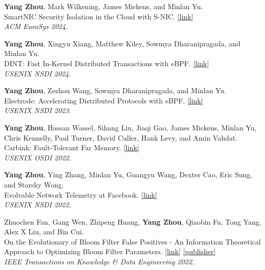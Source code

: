 \documentclass[letterpaper, 11pt]{article}
\newcounter{mySaveCounter}
\newenvironment{myEnumerateCitation}{%
  \begin{enumerate}[label={[\arabic*]},ref={[\arabic*]}]
    \usecounter{enumi}%
    \setcounter{enumi}{\value{mySaveCounter}}
    \setlength{\itemsep}{0pt}%
    \setlength{\parskip}{5pt}%
}
{%
  \setcounter{mySaveCounter}{\value{enumi}}\end{enumerate}%
}
\begin{document}
\begin{myEnumerateCitation}

\item \textbf{Yang Zhou}, Mark Wilkening, James Mickens, and Minlan Yu. 
\\SmartNIC Security Isolation in the Cloud with S-NIC. \href{https://dl.acm.org/doi/epdf/10.1145/3627703.3650071}{[link]}
\\\textit{ACM EuroSys 2024}.

\item \textbf{Yang Zhou}, Xingyu Xiang, Matthew Kiley, Sowmya Dharanipragada, and Minlan Yu. 
\\DINT: Fast In-Kernel Distributed Transactions with eBPF. \href{https://www.usenix.org/system/files/nsdi24-zhou-yang.pdf}{[link]}
\\\textit{USENIX NSDI 2024}.

\item \textbf{Yang Zhou}, Zezhou Wang, Sowmya Dharanipragada, and Minlan Yu. 
\\Electrode: Accelerating Distributed Protocols with eBPF. \href{https://www.usenix.org/system/files/nsdi23-zhou.pdf}{[link]}
\\\textit{USENIX NSDI 2023}.

\item \textbf{Yang Zhou}, Hassan Wassel, Sihang Liu, Jiaqi Gao, James Mickens, Minlan Yu, Chris Kennelly, Paul Turner, David Culler, Hank Levy, and Amin Vahdat. 
\\Carbink: Fault-Tolerant Far Memory. \href{https://www.usenix.org/system/files/osdi22-zhou-yang.pdf}{[link]}
\\\textit{USENIX OSDI 2022}.

\item \textbf{Yang Zhou}, Ying Zhang, Minlan Yu, Guangyu Wang, Dexter Cao, Eric Sung, and Starsky Wong. 
\\Evolvable Network Telemetry at Facebook. \href{https://www.usenix.org/system/files/nsdi22-paper-zhou.pdf}{[link]}
\\\textit{USENIX NSDI 2022}.

\item Zhuochen Fan, Gang Wen, Zhipeng Huang, \textbf{Yang Zhou}, Qiaobin Fu, Tong Yang, Alex X Liu, and Bin Cui. 
\\On the Evolutionary of Bloom Filter False Positives - An Information Theoretical Approach to Optimizing Bloom Filter Parameters. \href{https://yangzhou1997.github.io/paper/bf-tkde22.pdf}{[link]} \href{https://ieeexplore.ieee.org/document/9863640}{[publisher]}
\\\textit{IEEE Transactions on Knowledge \& Data Engineering 2022}.


\end{myEnumerateCitation}
\end{document}
